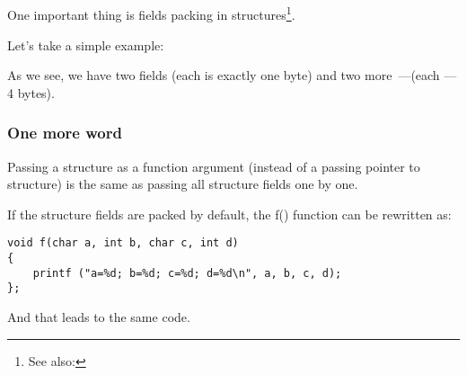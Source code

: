 \subsection{\StructurePackingSectionName}
\label{structure_packing}

One important thing is fields packing in structures\footnote{See also: \URLWPDA}.

Let's take a simple example:



As we see, we have two \Tchar fields (each is exactly one byte) and two more~---\Tint (each --- 4 bytes).





\subsubsection{One more word}

Passing a structure as a function argument (instead of a passing pointer to structure) is the same
as passing all structure fields one by one.

If the structure fields are packed by default, the f() function can be rewritten as:

\begin{lstlisting}
void f(char a, int b, char c, int d)
{
    printf ("a=%d; b=%d; c=%d; d=%d\n", a, b, c, d);
};
\end{lstlisting}

And that leads to the same code.
